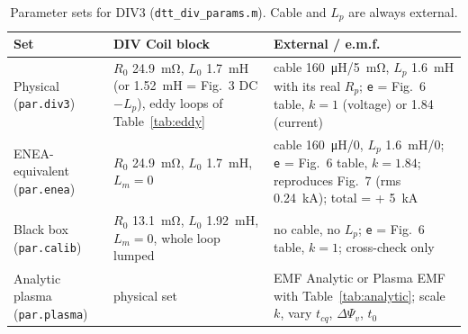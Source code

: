 \documentclass[11pt,a4paper]{article}
\newcommand{\code}[1]{\texttt{#1}}
\begin{document}
\begin{table}[htbp]
\centering\small
\caption{Parameter sets for DIV3 (\code{dtt\_div\_params.m}). Cable and $L_p$ are always external.}
\label{tab:sets}
\begin{tabular}{@{}L{3.4cm}L{6.4cm}L{5.6cm}@{}}
\toprule
Set & DIV Coil block & External / e.m.f.\\
\midrule
Physical (\code{par.div3}) & $R_0$ \SI{24.9}{\milli\ohm}, $L_0$ \SI{1.7}{\milli\henry} (or \SI{1.52}{\milli\henry} = Fig.~3 DC $- L_p$), eddy loops of Table~\ref{tab:eddy} & cable \SI{160}{\micro\henry}/\SI{5}{\milli\ohm}, $L_p$ \SI{1.6}{\milli\henry} with its real $R_p$; \code{e} = Fig.~6 table, $k = 1$ (voltage) or 1.84 (current)\\
ENEA-equivalent (\code{par.enea}) & $R_0$ \SI{24.9}{\milli\ohm}, $L_0$ \SI{1.7}{\milli\henry}, $L_{m} = 0$ & cable \SI{160}{\micro\henry}/\SI{0}{}, $L_p$ \SI{1.6}{\milli\henry}/\SI{0}{}; \code{e} = Fig.~6 table, $k = 1.84$; reproduces Fig.~7 (rms \SI{0.24}{\kilo\ampere}); total = + \SI{5}{\kilo\ampere}\\
Black box (\code{par.calib}) & $R_0$ \SI{13.1}{\milli\ohm}, $L_0$ \SI{1.92}{\milli\henry}, $L_m = 0$, whole loop lumped & no cable, no $L_p$; \code{e} = Fig.~6 table, $k = 1$; cross-check only\\
Analytic plasma (\code{par.plasma}) & physical set & EMF Analytic or Plasma EMF with Table~\ref{tab:analytic}; scale $k$, vary $t_{cq}$, $\Delta\Psi_v$, $t_0$\\
\bottomrule
\end{tabular}
\end{table}
\end{document}

